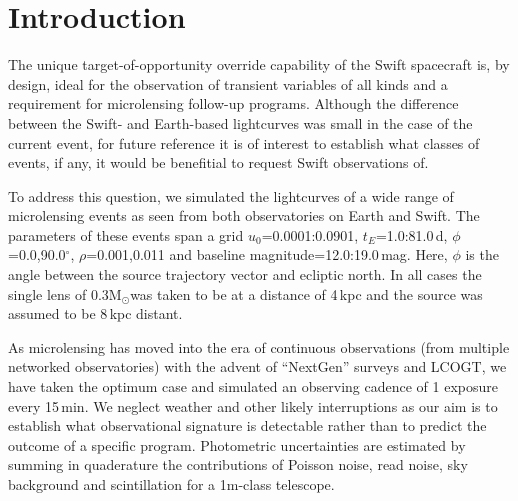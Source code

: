 \documentclass[preprint2]{aastex}
\newcommand{\Msol}{M$_{\odot}$}
\begin{document}

\section{Introduction}

The unique target-of-opportunity override capability of the Swift spacecraft is, by design, ideal for the observation of transient variables of all kinds and a requirement for microlensing follow-up programs.  Although the difference between the Swift- and Earth-based lightcurves was small in the case of the current event, for future reference it is of interest to establish what classes of events, if any, it would be benefitial to request Swift observations of.  

To address this question, we simulated the lightcurves of a wide range of microlensing events as seen from both observatories on Earth and Swift.  The parameters of these events span a grid $u_{0}$={0.0001:0.0901}, $t_{E}$={1.0:81.0}\,d, $\phi$={0.0,90.0}$^{\circ}$, $\rho$={0.001,0.011} and baseline magnitude={12.0:19.0}\,mag.  Here, $\phi$ is the angle between the source trajectory vector and ecliptic north.  In all cases the single lens of 0.3\Msol was taken to be at a distance of 4\,kpc and the source was assumed to be 8\,kpc distant.  

As microlensing has moved into the era of continuous observations (from multiple networked observatories) with the advent of ``NextGen'' surveys and LCOGT, we have taken the optimum case and simulated an observing cadence of 1 exposure every 15\,min.  We neglect weather and other likely interruptions as our aim is to establish what observational signature is detectable rather than to predict the outcome of a specific program.  Photometric uncertainties are estimated by summing in quaderature the  contributions of Poisson noise, read noise, sky background and scintillation for a 1m-class telescope.  
\end{document}
